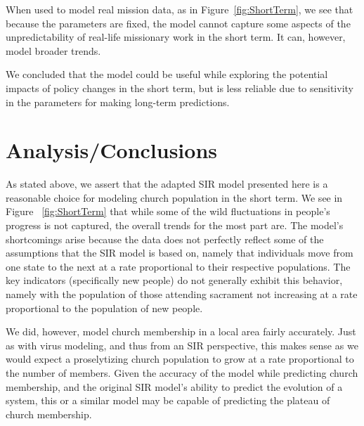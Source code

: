 \documentclass[11pt]{amsart}
\begin{document}
When used to model real mission data, as in Figure~\ref{fig:ShortTerm}, we see that because the parameters are fixed, the model cannot capture some aspects of the unpredictability of real-life missionary work in the short term. It can, however, model broader trends.

We concluded that the model could be useful while exploring the potential impacts of policy changes in the short term, but is less reliable due to sensitivity in the parameters for making long-term predictions. 

\section{Analysis/Conclusions}

As stated above, we assert that the adapted SIR model presented here is a reasonable choice for modeling church population in the short term. We see in Figure ~\ref{fig:ShortTerm} that while some of the wild fluctuations in people's progress is not captured, the overall trends for the most part are. The model's shortcomings arise because the data does not perfectly reflect some of the assumptions that the SIR model is based on, namely that individuals move from one state to the next at a rate proportional to their respective populations. The key indicators (specifically new people) do not generally exhibit this behavior, namely with the population of those attending sacrament not increasing at a rate proportional to the population of new people.

We did, however, model church membership in a local area fairly accurately. Just as with virus modeling, and thus from an SIR perspective, this makes sense as we would expect a proselytizing church population to grow at a rate proportional to the number of members. Given the accuracy of the model while predicting church membership, and the original SIR model's ability to predict the evolution of a system, this or a similar model may be capable of predicting the plateau of church membership.


\FloatBarrier %
\newpage


\end{document}
